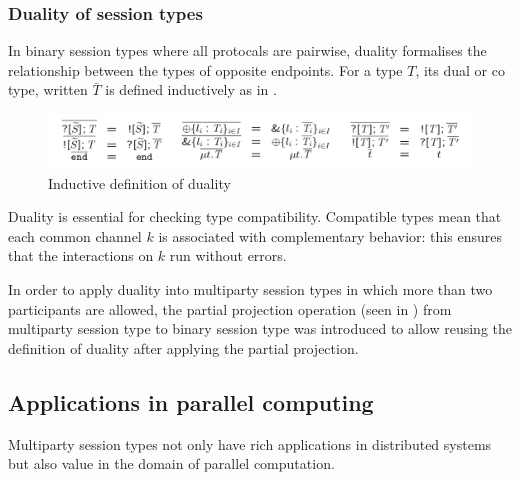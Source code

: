 \subsubsection{Duality of session types}
In binary session types where all protocals are pairwise, duality formalises the relationship between the types of opposite endpoints. For a type $T$, its dual or co type, written $\bar{T}$ is defined inductively as in .
\begin{figure}[H]
\includegraphics[width=\textwidth]{background/image/dual-def.png}
\caption{Inductive definition of duality}
\label{b:mpst:dualdef}
\end{figure}

Duality is essential for checking type compatibility. Compatible types mean that each common channel $k$ is associated with complementary behavior: this ensures that the interactions on $k$ run without errors. 

In order to apply duality into multiparty session types in which more than two participants are allowed, the partial projection operation (seen in \cite{coppoGentleIntroductionMultiparty2015}) from multiparty session type to binary session type was introduced to allow reusing the definition of duality after applying the partial projection.
\subsection{Applications in parallel computing} \label{b:mpst:app}
Multiparty session types not only have rich applications in distributed systems but also value in the domain of parallel computation. 

